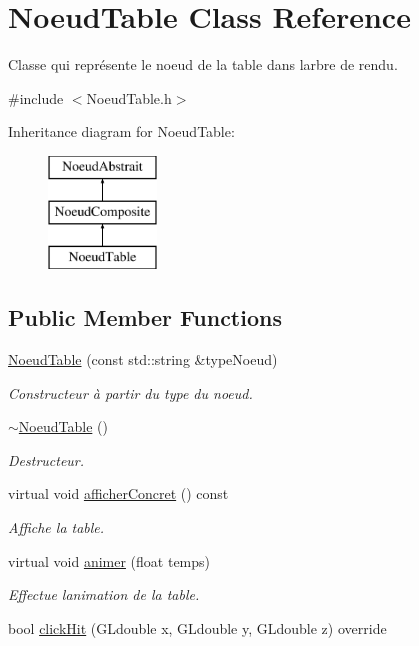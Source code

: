 \hypertarget{class_noeud_table}{}\section{Noeud\+Table Class Reference}
\label{class_noeud_table}


Classe qui représente le noeud de la table dans l\textquotesingle{}arbre de rendu.  




{\ttfamily \#include $<$Noeud\+Table.\+h$>$}

Inheritance diagram for Noeud\+Table\+:\begin{figure}[H]
\begin{center}
\leavevmode
\includegraphics[height=3.000000cm]{class_noeud_table}
\end{center}
\end{figure}
\subsection*{Public Member Functions}
{\bf }\par
\begin{DoxyCompactItemize}
\item 
\hyperlink{class_noeud_table_a40983870720b331d17daeeb306e12ef5}{Noeud\+Table} (const std\+::string \&type\+Noeud)
\begin{DoxyCompactList}\small\item\em Constructeur à partir du type du noeud. \end{DoxyCompactList}\item 
\hyperlink{class_noeud_table_a6171c2df59de6f454f0d8c7915403ce7}{$\sim$\+Noeud\+Table} ()
\begin{DoxyCompactList}\small\item\em Destructeur. \end{DoxyCompactList}\item 
virtual void \hyperlink{class_noeud_table_aa2876d070dd6fe57b0b90077fcd5036d}{afficher\+Concret} () const 
\begin{DoxyCompactList}\small\item\em Affiche la table. \end{DoxyCompactList}\item 
virtual void \hyperlink{class_noeud_table_adf419e5147546815052d75529c4c45ab}{animer} (float temps)
\begin{DoxyCompactList}\small\item\em Effectue l\textquotesingle{}animation de la table. \end{DoxyCompactList}\item 
bool \hyperlink{class_noeud_table_a75ee424199cdc37e8e2b1280505b93c6}{click\+Hit} (G\+Ldouble x, G\+Ldouble y, G\+Ldouble z) override
\end{DoxyCompactItemize}

